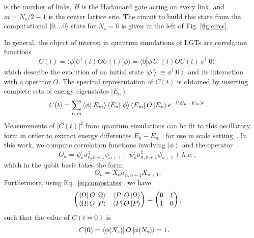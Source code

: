 \documentclass[twocolumn,superscriptaddress,showpacs,nofootinbib,notitlepage,preprintnumbers,secnumarabic,amssymb, floatfix, nobibnotes, aps, prd]{revtex4-2}
\newcommand{\ket}[1]{\left| #1 \right>} %
\newcommand{\braket}[2]{\left< #1 \vphantom{#2} \right|
 \left. #2 \vphantom{#1} \right>} %
\newcommand{\mbraket}[3]{\left< #1 \vphantom{#2#3} \right|
 #2 \left| #3 \vphantom{#1#2} \right>} %
\begin{document}
is the number of links, $H$ is the Hadamard gate acting on every link, and $m=N_s/2-1$ is the center lattice site.
The circuit to build this state from the computational $|0....0\rangle$ state for $N_s=6$ is given in the left of Fig. \ref{fig:circs}.

In general, the object of interest in quantum simulations of LGTs are correlation functions 
\begin{equation}
  C(t) =  \langle\phi | U^\dagger(t) O U(t) | \phi \rangle=\langle 0|\phi \, U^\dagger(t) O U(t) \, \phi^\dagger | 0 \rangle. \label{eq:correlator}
\end{equation}
which describe the evolution of an initial state $\ket{\phi} \equiv \phi^\dagger \ket{0}$ and its interaction with a operator $O$. 
The spectral representation of $C(t)$ is obtained by inserting complete sets of energy eigenstates $\ket{E_n}$
\begin{equation}
  C(t) = \sum_{n,m} \braket{\phi}{E_m } \braket{ E_n }{ \phi } \mbraket{E_m}{O}{E_n} e^{-i(E_n - E_m)t}. \label{eq:spec}
\end{equation}
Measurements of $|C(t)|^2$ from quantum simulations can be fit to this oscillatory form in order to extract energy differences $E_n - E_m$~\cite{Charles:2023zbl} for use in scale setting~\cite{Carena:2021ltu,Clemente:2022cka,Crippa:2024cqr}. In this work, we compute correlation functions involving $\ket{\phi}$ and the operator
\begin{equation}
\label{eq:exciteoperator}
    O_{n} = \psi^{\dagger}_n\sigma^{z}_{n,n+1}\psi_{n+1} + \psi^{\dagger}_n \sigma^{z}_{n, n+1}\psi^\dagger_{n+1} + h.c.\,,
\end{equation}
which in the qubit basis takes the form:
\begin{equation}
  O_{n} = X_n \sigma^z_{n,n+1} X_{n+1}.
\end{equation}
Furthermore, using Eq.~\eqref{eq:compstates}, we have 
\begin{equation}
    \begin{pmatrix}
    \mbraket{ \Omega }{ O }{ \Omega }&\mbraket{ P }{ O }{ \Omega }\\
    \mbraket{ \Omega }{ O }{ P }&\mbraket{ P }{ O }{ P }\\
    \end{pmatrix}=\begin{pmatrix}
        0&1\\
        1&0\\
    \end{pmatrix},
\end{equation}
such that the value of $C(t=0)$ is
\begin{equation}
  \begin{split}
    C(0) &= \mbraket{ \phi(N_s) }{ O }{ \phi(N_s) } = 1.
  \end{split}
\end{equation}
\end{document}
